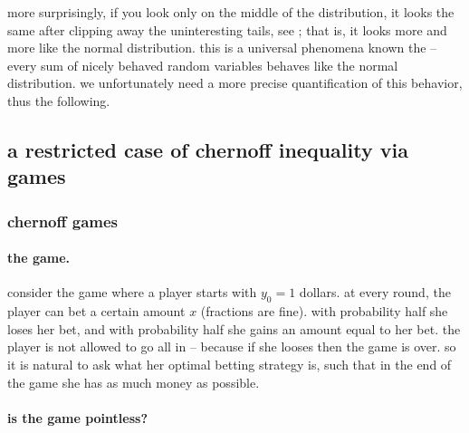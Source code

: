 more surprisingly, if you look only on the middle of the distribution,
it looks the same after clipping away the uninteresting tails, see
; that is, it looks more and more
like the normal distribution. this is a universal phenomena known the
 -- every sum of nicely behaved random
variables behaves like the normal distribution. we unfortunately need
a more precise quantification of this behavior, thus the following.








\subsection{a restricted case of chernoff inequality via %
   games}
\subsubsection{chernoff games}

\paragraph*{the game.}

consider the game where a player starts with $y_0=1$ dollars. at every
round, the player can bet a certain amount $x$ (fractions are
fine). with probability half she loses her bet, and with probability
half she gains an amount equal to her bet.  the player is not allowed
to go all in -- because if she looses then the game is over. so it is
natural to ask what her optimal betting strategy is, such that in the
end of the game she has as much money as possible.


\paragraph*{is the game pointless?}


